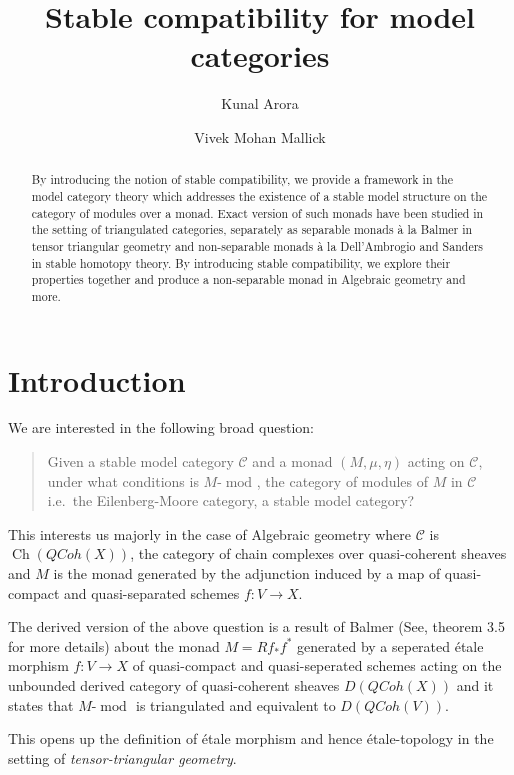 \documentclass{article}
\title{Stable compatibility for model categories}
\author{Kunal Arora \and Vivek Mohan Mallick}
\newcommand{\cC}{\mathcal{C}}
\newcommand{\module}[2][]{#2\text{-}\modop_{#1}}
\DeclareMathOperator{\Ch}{Ch}
\DeclareMathOperator{\modop}{mod}
\theoremstyle{definition}
\theoremstyle{remark}
\begin{document}
\maketitle
\begin{abstract}
By introducing the notion of stable compatibility, we provide a framework in the model category theory which addresses the existence of a stable model structure on the category of modules over a monad. Exact version of such monads have been studied in the setting of triangulated categories, separately as separable monads \`a la Balmer in tensor triangular geometry and non-separable monads \`a la Dell'Ambrogio and Sanders in stable homotopy theory. By introducing stable compatibility, we explore their properties together and produce a non-separable monad in Algebraic geometry and more.
\end{abstract}

\tableofcontents

\section{Introduction}
We are interested in the following broad question:
\begin{quote}
Given a stable model category  $\cC$ and a monad  $(M, \mu, \eta)$ acting on $\cC$, under what conditions is $\module{M}$, the category of modules of $M$ in $\cC$ i.e.\ the Eilenberg-Moore category, a stable model category?
\end{quote}
This interests us majorly in the case of Algebraic geometry where $\cC$ is $\Ch(QCoh(X))$, the category of chain complexes over quasi-coherent sheaves and $M$ is the monad generated by the adjunction induced by a map of quasi-compact and quasi-separated schemes $f:V \rightarrow X$.

The derived version of the above question is a result of Balmer (See, \cite{balmer:etalneth} theorem 3.5 for more details) about the monad $M=Rf_{*}f^{*}$ generated by a seperated \'etale morphism $f:V \rightarrow X$ of  quasi-compact and quasi-seperated schemes acting on the unbounded derived category of quasi-coherent sheaves $D(QCoh(X))$ and it states that $\module{M}$  is triangulated and equivalent to $D(QCoh(V))$. 

This opens up the definition of \'etale morphism and hence \'etale-topology in the setting of \textit{tensor-triangular geometry}.
\end{document}
